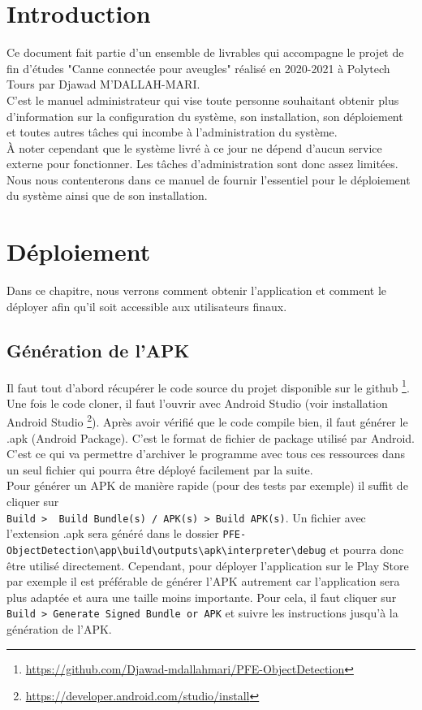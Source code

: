 \documentclass[UTF8]{EPURapport}
\begin{document}
\chapter{Introduction}

Ce document fait partie d'un ensemble de livrables qui accompagne le projet de fin d'études "Canne connectée pour aveugles" réalisé en 2020-2021 à Polytech Tours par Djawad M'DALLAH-MARI.\\

C'est le manuel administrateur qui vise toute personne souhaitant obtenir plus d'information sur la configuration du système, son installation, son déploiement et toutes autres tâches qui incombe à l'administration du système.\\

À noter cependant que le système livré à ce jour ne dépend d'aucun service externe pour fonctionner. Les tâches d'administration sont donc assez limitées. Nous nous contenterons dans ce manuel de fournir l'essentiel pour le déploiement du système ainsi que de son installation. 

\chapter{Déploiement}
Dans ce chapitre, nous verrons comment obtenir l'application et comment le déployer afin qu'il soit accessible aux utilisateurs finaux.

\section{Génération de l'APK}\label{genapk}

Il faut tout d'abord récupérer le code source du projet disponible sur le github \footnote{\url{https://github.com/Djawad-mdallahmari/PFE-ObjectDetection}}. Une fois le code cloner, il faut l'ouvrir avec Android Studio (voir installation Android Studio \footnote{\url{https://developer.android.com/studio/install}}). Après avoir vérifié que le code compile bien, il faut générer le .apk (Android Package). C'est le format de fichier de package utilisé par Android. C'est ce qui va permettre d'archiver le programme avec tous ces ressources dans un seul fichier qui pourra être déployé facilement par la suite.\\
Pour générer un APK de manière rapide (pour des tests par exemple) il suffit de cliquer sur\\ \verb|Build >  Build Bundle(s) / APK(s) > Build APK(s)|. Un fichier avec l'extension .apk sera généré dans le dossier \verb|PFE-ObjectDetection\app\build\outputs\apk\interpreter\debug| et pourra donc être utilisé directement. Cependant, pour déployer l'application sur le Play Store par exemple il est préférable de générer l'APK autrement car l'application sera plus adaptée et aura une taille moins importante. Pour cela, il faut cliquer sur \verb|Build > Generate Signed Bundle or APK| et suivre les instructions jusqu'à la génération de l'APK.
\end{document}
